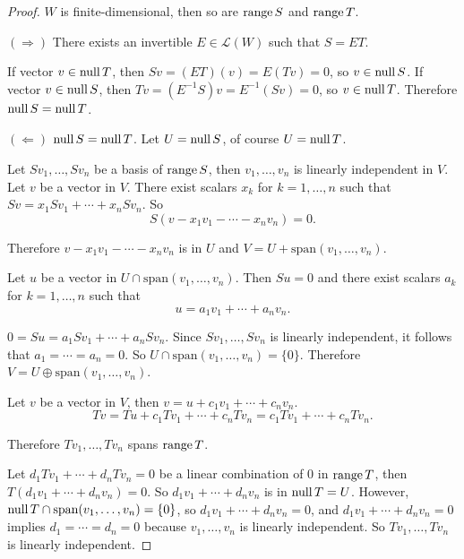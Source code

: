 \begin{proof}
    $W$ is finite-dimensional, then so are $\text{range}\,{S}$ and $\text{range}\,{T}$.

    $(\Rightarrow)$ There exists an invertible $E \in \mathcal{L}(W)$ such that $S = ET$.

    If vector $v\in\text{null}\,{T}$, then $Sv = (ET)(v) = E(Tv) = 0$, so $v\in\text{null}\,{S}$. If vector $v\in\text{null}\,{S}$, then $Tv = (E^{-1}S)v = E^{-1}(Sv) = 0$, so $v\in\text{null}\,{T}$. Therefore $\text{null}\,{S} = \text{null}\,{T}$.

    $(\Leftarrow)$ $\text{null}\,{S} = \text{null}\,{T}$. Let $U = \text{null}\,{S}$, of course $U = \text{null}\,{T}$.

    Let $Sv_{1}, \ldots, Sv_{n}$ be a basis of $\text{range}\,{S}$, then $v_{1}, \ldots, v_{n}$ is linearly independent in $V$. Let $v$ be a vector in $V$. There exist scalars $x_{k}$ for $k = 1,\ldots, n$ such that $Sv = x_{1}Sv_{1} + \cdots + x_{n}Sv_{n}$. So
    \[
        S(v - x_{1}v_{1} - \cdots - x_{n}v_{n}) = 0.
    \]

    Therefore $v - x_{1}v_{1} - \cdots - x_{n}v_{n}$ is in $U$ and $V = U + \text{span}(v_{1}, \ldots, v_{n})$.

    Let $u$ be a vector in $U\cap \text{span}(v_{1}, \ldots, v_{n})$. Then $Su = 0$ and there exist scalars $a_{k}$ for $k = 1,\ldots, n$ such that
    \[
        u = a_{1}v_{1} + \cdots + a_{n}v_{n}.
    \]

    $0 = Su = a_{1}Sv_{1} + \cdots + a_{n}Sv_{n}$. Since $Sv_{1}, \ldots, Sv_{n}$ is linearly independent, it follows that $a_{1} = \cdots = a_{n} = 0$. So $U\cap \text{span}(v_{1}, \ldots, v_{n}) = \{ 0 \}$. Therefore $V = U \oplus \text{span}(v_{1}, \ldots, v_{n})$.

    Let $v$ be a vector in $V$, then $v = u + c_{1}v_{1} + \cdots + c_{n}v_{n}$.
    \[
        Tv = Tu + c_{1}Tv_{1} + \cdots + c_{n}Tv_{n} = c_{1}Tv_{1} + \cdots + c_{n}Tv_{n}.
    \]

    Therefore $Tv_{1}, \ldots, Tv_{n}$ spans $\text{range}\,{T}$.

    Let $d_{1}Tv_{1} + \cdots + d_{n}Tv_{n} = 0$ be a linear combination of $0$ in $\text{range}\,{T}$, then $T(d_{1}v_{1} + \cdots + d_{n}v_{n}) = 0$. So $d_{1}v_{1} + \cdots + d_{n}v_{n}$ is in $\text{null}\,{T} = U$. However, $\text{null}\,{T}\cap\text{span}(v_{1}, \ldots, v_{n}) = \{0\}$, so $d_{1}v_{1} + \cdots + d_{n}v_{n} = 0$, and $d_{1}v_{1} + \cdots + d_{n}v_{n} = 0$ implies $d_{1} = \cdots = d_{n} = 0$ because $v_{1}, \ldots, v_{n}$ is linearly independent. So $Tv_{1}, \ldots, Tv_{n}$ is linearly independent.


\end{proof}
